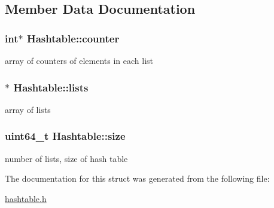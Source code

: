 \subsection{Member Data Documentation}
\subsubsection[{\texorpdfstring{counter}{counter}}]{\setlength{\rightskip}{0pt plus 5cm}int$\ast$ Hashtable\+::counter}\hypertarget{structHashtable_a99f7c11aa20bbd066528843438a42958}{}\label{structHashtable_a99f7c11aa20bbd066528843438a42958}
array of counters of elements in each list 
\subsubsection[{\texorpdfstring{lists}{lists}}]{$\ast$ Hashtable\+::lists}\hypertarget{structHashtable_ac4140ebb0209a40547999cce896fe17c}{}\label{structHashtable_ac4140ebb0209a40547999cce896fe17c}
array of lists 
\subsubsection[{\texorpdfstring{size}{size}}]{\setlength{\rightskip}{0pt plus 5cm}uint64\+\_\+t Hashtable\+::size}\hypertarget{structHashtable_aab81586954ce81cc3d52b41cf5ec5a04}{}\label{structHashtable_aab81586954ce81cc3d52b41cf5ec5a04}
number of lists, size of hash table 

The documentation for this struct was generated from the following file\+:\begin{DoxyCompactItemize}
\item 
\hyperlink{hashtable_8h}{hashtable.\+h}\end{DoxyCompactItemize}
